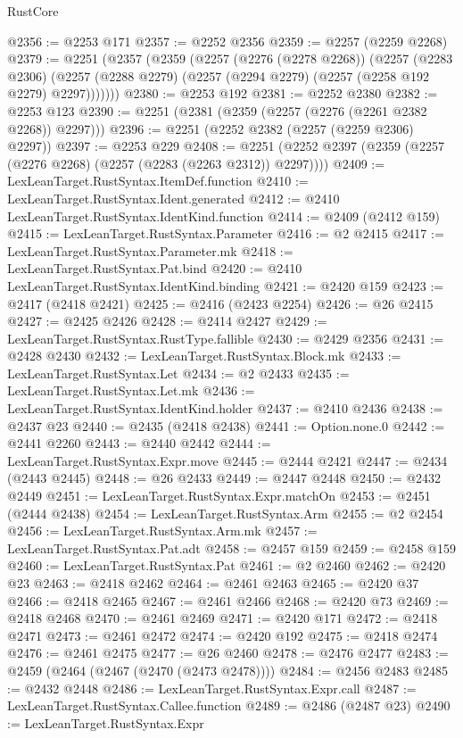 \begin{lexlean}{RustCore}
\begin{coremodule}
@2356 := @2253 @171
@2357 := @2252 @2356
@2359 := @2257 (@2259 @2268)
@2379 := @2251
    (@2357
      (@2359
        (@2257
          (@2276 (@2278 @2268))
          (@2257
            (@2283 @2306)
            (@2257 (@2288 @2279) (@2257 (@2294 @2279) (@2257 (@2258 @192 @2279) @2297)))))))
@2380 := @2253 @192
@2381 := @2252 @2380
@2382 := @2253 @123
@2390 := @2251 (@2381 (@2359 (@2257 (@2276 (@2261 @2382 @2268)) @2297)))
@2396 := @2251 (@2252 @2382 (@2257 (@2259 @2306) @2297))
@2397 := @2253 @229
@2408 := @2251 (@2252 @2397 (@2359 (@2257 (@2276 @2268) (@2257 (@2283 (@2263 @2312)) @2297))))
@2409 := LexLeanTarget.RustSyntax.ItemDef.function
@2410 := LexLeanTarget.RustSyntax.Ident.generated
@2412 := @2410 LexLeanTarget.RustSyntax.IdentKind.function
@2414 := @2409 (@2412 @159)
@2415 := LexLeanTarget.RustSyntax.Parameter
@2416 := @2 @2415
@2417 := LexLeanTarget.RustSyntax.Parameter.mk
@2418 := LexLeanTarget.RustSyntax.Pat.bind
@2420 := @2410 LexLeanTarget.RustSyntax.IdentKind.binding
@2421 := @2420 @159
@2423 := @2417 (@2418 @2421)
@2425 := @2416 (@2423 @2254)
@2426 := @26 @2415
@2427 := @2425 @2426
@2428 := @2414 @2427
@2429 := LexLeanTarget.RustSyntax.RustType.fallible
@2430 := @2429 @2356
@2431 := @2428 @2430
@2432 := LexLeanTarget.RustSyntax.Block.mk
@2433 := LexLeanTarget.RustSyntax.Let
@2434 := @2 @2433
@2435 := LexLeanTarget.RustSyntax.Let.mk
@2436 := LexLeanTarget.RustSyntax.IdentKind.holder
@2437 := @2410 @2436
@2438 := @2437 @23
@2440 := @2435 (@2418 @2438)
@2441 := Option.none.{0}
@2442 := @2441 @2260
@2443 := @2440 @2442
@2444 := LexLeanTarget.RustSyntax.Expr.move
@2445 := @2444 @2421
@2447 := @2434 (@2443 @2445)
@2448 := @26 @2433
@2449 := @2447 @2448
@2450 := @2432 @2449
@2451 := LexLeanTarget.RustSyntax.Expr.matchOn
@2453 := @2451 (@2444 @2438)
@2454 := LexLeanTarget.RustSyntax.Arm
@2455 := @2 @2454
@2456 := LexLeanTarget.RustSyntax.Arm.mk
@2457 := LexLeanTarget.RustSyntax.Pat.adt
@2458 := @2457 @159
@2459 := @2458 @159
@2460 := LexLeanTarget.RustSyntax.Pat
@2461 := @2 @2460
@2462 := @2420 @23
@2463 := @2418 @2462
@2464 := @2461 @2463
@2465 := @2420 @37
@2466 := @2418 @2465
@2467 := @2461 @2466
@2468 := @2420 @73
@2469 := @2418 @2468
@2470 := @2461 @2469
@2471 := @2420 @171
@2472 := @2418 @2471
@2473 := @2461 @2472
@2474 := @2420 @192
@2475 := @2418 @2474
@2476 := @2461 @2475
@2477 := @26 @2460
@2478 := @2476 @2477
@2483 := @2459 (@2464 (@2467 (@2470 (@2473 @2478))))
@2484 := @2456 @2483
@2485 := @2432 @2448
@2486 := LexLeanTarget.RustSyntax.Expr.call
@2487 := LexLeanTarget.RustSyntax.Callee.function
@2489 := @2486 (@2487 @23)
@2490 := LexLeanTarget.RustSyntax.Expr

\end{coremodule}
\end{lexlean}

